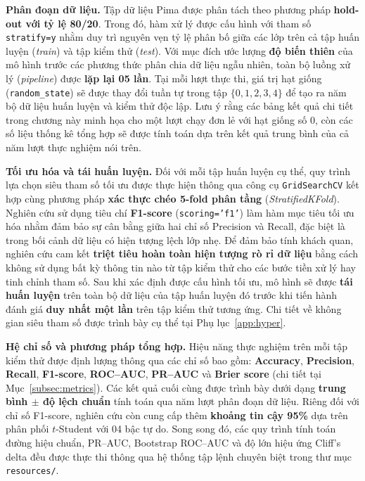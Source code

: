 \documentclass[14pt,a4paper]{extreport}
\begin{document}
\textbf{Phân đoạn dữ liệu.} Tập dữ liệu Pima được phân tách theo phương pháp \textbf{hold-out với tỷ lệ 80/20}. Trong đó, hàm xử lý được cấu hình với tham số \texttt{stratify=y} nhằm duy trì nguyên vẹn tỷ lệ phân bố giữa các lớp trên cả tập huấn luyện (\textit{train}) và tập kiểm thử (\textit{test}). Với mục đích ước lượng \textbf{độ biến thiên} của mô hình trước các phương thức phân chia dữ liệu ngẫu nhiên, toàn bộ luồng xử lý (\textit{pipeline}) được \textbf{lặp lại 05 lần}. Tại mỗi lượt thực thi, giá trị hạt giống (\texttt{random\_state}) sẽ được thay đổi tuần tự trong tập $\{0,1,2,3,4\}$ để tạo ra năm bộ dữ liệu huấn luyện và kiểm thử độc lập. Lưu ý rằng các bảng kết quả chi tiết trong chương này minh họa cho một lượt chạy đơn lẻ với hạt giống số 0, còn các số liệu thống kê tổng hợp sẽ được tính toán dựa trên kết quả trung bình của cả năm lượt thực nghiệm nói trên.

\textbf{Tối ưu hóa và tái huấn luyện.} Đối với mỗi tập huấn luyện cụ thể, quy trình lựa chọn siêu tham số tối ưu được thực hiện thông qua công cụ \texttt{GridSearchCV} kết hợp cùng phương pháp \textbf{xác thực chéo 5-fold phân tầng} (\textit{StratifiedKFold}). Nghiên cứu sử dụng tiêu chí \textbf{F1-score} (\texttt{scoring='f1'}) làm hàm mục tiêu tối ưu hóa nhằm đảm bảo sự cân bằng giữa hai chỉ số Precision và Recall, đặc biệt là trong bối cảnh dữ liệu có hiện tượng lệch lớp nhẹ. Để đảm bảo tính khách quan, nghiên cứu cam kết \textbf{triệt tiêu hoàn toàn hiện tượng rò rỉ dữ liệu} bằng cách không sử dụng bất kỳ thông tin nào từ tập kiểm thử cho các bước tiền xử lý hay tinh chỉnh tham số. Sau khi xác định được cấu hình tối ưu, mô hình sẽ được \textbf{tái huấn luyện} trên toàn bộ dữ liệu của tập huấn luyện đó trước khi tiến hành đánh giá \textbf{duy nhất một lần} trên tập kiểm thử tương ứng. Chi tiết về không gian siêu tham số được trình bày cụ thể tại Phụ lục~\ref{app:hyper}.

\textbf{Hệ chỉ số và phương pháp tổng hợp.} Hiệu năng thực nghiệm trên mỗi tập kiểm thử được định lượng thông qua các chỉ số bao gồm: \textbf{Accuracy}, \textbf{Precision}, \textbf{Recall}, \textbf{F1-score}, \textbf{ROC--AUC}, \textbf{PR--AUC} và \textbf{Brier score} (chi tiết tại Mục~\ref{subsec:metrics}). Các kết quả cuối cùng được trình bày dưới dạng \textbf{trung bình $\pm$ độ lệch chuẩn} tính toán qua năm lượt phân đoạn dữ liệu. Riêng đối với chỉ số F1-score, nghiên cứu còn cung cấp thêm \textbf{khoảng tin cậy 95\%} dựa trên phân phối $t$-Student với 04 bậc tự do. Song song đó, các quy trình tính toán đường hiệu chuẩn, PR--AUC, Bootstrap ROC--AUC và độ lớn hiệu ứng Cliff's delta đều được thực thi thông qua hệ thống tập lệnh chuyên biệt trong thư mục \texttt{resources/}.
\end{document}
